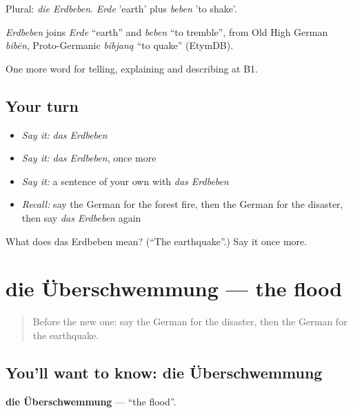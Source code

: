 Plural: \emph{die Erdbeben}. \emph{Erde} 'earth' plus \emph{beben} 'to shake'.

\begin{cousinweb}
\emph{Erdbeben} joins \emph{Erde} \textquotedblleft{}earth\textquotedblright{} and \emph{beben} \textquotedblleft{}to tremble\textquotedblright{}, from Old High German \emph{bibēn}, Proto-Germanic \emph{bibjaną} \textquotedblleft{}to quake\textquotedblright{} (EtymDB).
\end{cousinweb}

\begin{grammarlens}[title={What you've built}]
One more word for telling, explaining and describing at B1.
\end{grammarlens}

\subsection*{Your turn}
\begin{itemize}
\raggedright
  \item \emph{Say it:} \emph{das Erdbeben}
  \item \emph{Say it:} \emph{das Erdbeben}, once more
  \item \emph{Say it:} a sentence of your own with \emph{das Erdbeben}
  \item \emph{Recall:} say the German for the forest fire, then the German for the disaster, then say \emph{das Erdbeben} again
\end{itemize}

\begin{tcolorbox}[breakable,colback=teal!4,colframe=teal!35!black,title={Before you move on}]
What does das Erdbeben mean? (\textquotedblleft{}The earthquake\textquotedblright{}.) Say it once more.
\end{tcolorbox}
\section[die Überschwemmung]{die Überschwemmung — the flood}

\label{lesson:GE-C294-ueberschwemmung}



\begin{quote}
Before the new one: say the German for the disaster, then the German for the earthquake.
\end{quote}

\subsection*{You'll want to know: die Überschwemmung}
\textbf{die Überschwemmung} — \textquotedblleft{}the flood\textquotedblright{}.


